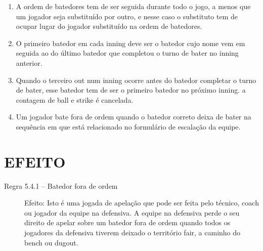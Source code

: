 \begin{enumerate}[label=(\alph*)]
	\item   A ordem de batedores tem de ser seguida durante todo o jogo, a menos que um jogador seja substituído por outro, e nesse caso o substituto tem de ocupar lugar do jogador substituído na ordem de batedores.
	\item  O primeiro batedor em cada \gls{inning} deve ser o batedor cujo nome vem em seguida ao do último batedor que completou o turno de bater no \gls{inning} anterior.
	\item  Quando o terceiro \gls{out} num \gls{inning} ocorre antes do batedor completar o turno de bater, esse batedor tem de ser o primeiro batedor no próximo \gls{inning}. a contagem de \gls{ball} e \gls{strike} é cancelada.
	\item  Um jogador bate fora de ordem quando o batedor correto deixa de bater na sequência em que está relacionado no formulário de escalação da equipe.
\end{enumerate}

\section*{EFEITO}

	\begin{description}
		\item[Regra 5.4.1 -- Batedor fora de ordem] Efeito: Isto é uma jogada de apelação que pode ser feita pelo técnico, \gls{coach} ou jogador da equipe na defensiva. A equipe na defensiva perde o seu direito de apelar sobre um batedor fora de ordem quando todos os jogadores da defensiva tiverem deixado o território \gls{fair}, a caminho do \gls{bench} ou \gls{dugout}.
	\end{description}

